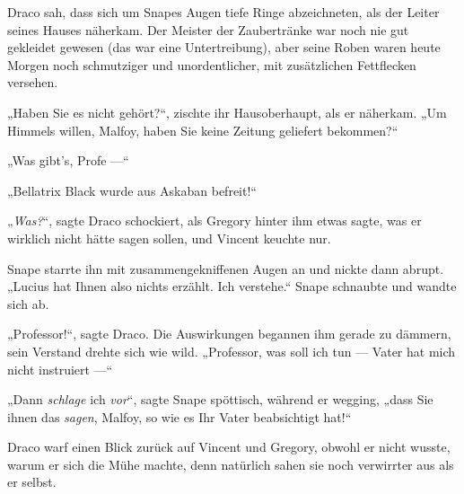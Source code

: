 Draco sah, dass sich um Snapes Augen tiefe Ringe abzeichneten, als der Leiter seines Hauses näherkam. Der Meister der Zaubertränke war noch nie gut gekleidet gewesen (das war eine Untertreibung), aber seine Roben waren heute Morgen noch schmutziger und unordentlicher, mit zusätzlichen Fettflecken versehen.

„Haben Sie es nicht gehört?“, zischte ihr Hausoberhaupt, als er näherkam.
„Um Himmels willen, Malfoy, haben Sie keine Zeitung geliefert bekommen?“

„Was gibt’s, Profe —“

„Bellatrix Black wurde aus Askaban befreit!“

„\emph{Was?}“, sagte Draco schockiert, als Gregory hinter ihm etwas sagte, was er wirklich nicht hätte sagen sollen, und Vincent keuchte nur.

Snape starrte ihn mit zusammengekniffenen Augen an und nickte dann abrupt.
„Lucius hat Ihnen also nichts erzählt. Ich verstehe.“ Snape schnaubte und wandte sich ab.

„Professor!“, sagte Draco. Die Auswirkungen begannen ihm gerade zu dämmern, sein Verstand drehte sich wie wild.
„Professor, was soll ich tun — Vater hat mich nicht instruiert —“

„Dann \emph{schlage} ich \emph{vor}“, sagte Snape spöttisch, während er wegging, „dass Sie ihnen das \emph{sagen}, Malfoy, so wie es Ihr Vater beabsichtigt hat!“

Draco warf einen Blick zurück auf Vincent und Gregory, obwohl er nicht wusste, warum er sich die Mühe machte, denn natürlich sahen sie noch verwirrter aus als er selbst.


